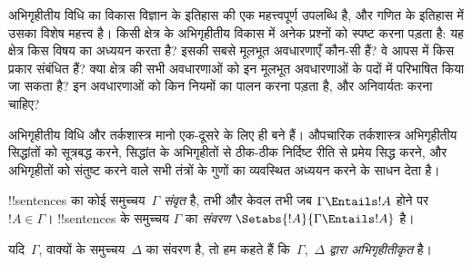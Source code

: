\documentclass[../../../include/open-logic-section]{subfiles}
\begin{document}

\begin{explain}
अभिगृहीतीय विधि का विकास विज्ञान के इतिहास की एक महत्त्वपूर्ण उपलब्धि है,
और गणित के इतिहास में उसका विशेष महत्त्व है। किसी क्षेत्र के अभिगृहीतीय
विकास में अनेक प्रश्नों को स्पष्ट करना पड़ता है: यह क्षेत्र किस विषय का
अध्ययन करता है? इसकी सबसे मूलभूत अवधारणाएँ कौन-सी हैं? वे आपस में किस प्रकार
संबंधित हैं? क्या क्षेत्र की सभी अवधारणाओं को इन मूलभूत अवधारणाओं के पदों में
परिभाषित किया जा सकता है? इन अवधारणाओं को किन नियमों का पालन करना पड़ता है,
और अनिवार्यतः करना चाहिए?

अभिगृहीतीय विधि और तर्कशास्त्र मानो एक-दूसरे के लिए ही बने हैं। औपचारिक
तर्कशास्त्र अभिगृहीतीय सिद्धांतों को सूत्रबद्ध करने, सिद्धांत के अभिगृहीतों से
ठीक-ठीक निर्दिष्ट रीति से प्रमेय सिद्ध करने, और अभिगृहीतों को संतुष्ट करने वाले
सभी तंत्रों के गुणों का व्यवस्थित अध्ययन करने के साधन देता है।
\end{explain}

\begin{defn}
!!{sentence}s का कोई समुच्चय~$\Gamma$ \emph{संवृत} है, तभी और केवल तभी जब
$\Gamma \Entails !A$ होने पर $!A \in \Gamma$। !!{sentence}s के समुच्चय
$\Gamma$ का \emph{संवरण} $\Setabs{!A}{\Gamma \Entails !A}$ है।

यदि~$\Gamma$, वाक्यों के समुच्चय~$\Delta$ का संवरण है, तो हम कहते हैं
कि~$\Gamma$,~$\Delta$ \emph{द्वारा अभिगृहीतीकृत} है।
\end{defn}
\end{document}
